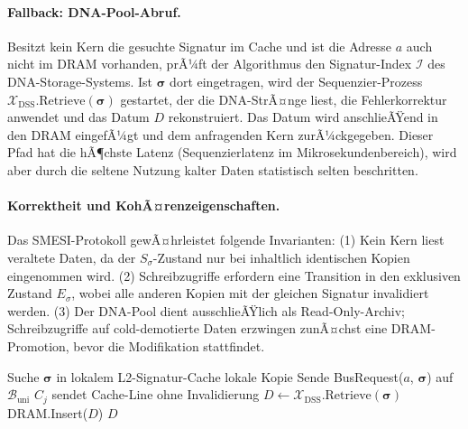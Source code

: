 ﻿\documentclass[a4paper,12pt]{article}
\theoremstyle{definition}
\begin{document}
\paragraph{Fallback: DNA-Pool-Abruf.}
Besitzt kein Kern die gesuchte Signatur im Cache und ist die Adresse $a$ auch nicht im DRAM vorhanden, prÃ¼ft der Algorithmus den Signatur-Index $\mathcal{I}$ des DNA-Storage-Systems. Ist $\boldsymbol{\sigma}$ dort eingetragen, wird der Sequenzier-Prozess $\mathcal{X}_{\mathrm{DSS}}.\mathrm{Retrieve}(\boldsymbol{\sigma})$ gestartet, der die DNA-StrÃ¤nge liest, die Fehlerkorrektur anwendet und das Datum $D$ rekonstruiert. Das Datum wird anschlieÃŸend in den DRAM eingefÃ¼gt und dem anfragenden Kern zurÃ¼ckgegeben. Dieser Pfad hat die hÃ¶chste Latenz (Sequenzierlatenz im Mikrosekundenbereich), wird aber durch die seltene Nutzung kalter Daten statistisch selten beschritten.

\paragraph{Korrektheit und KohÃ¤renzeigenschaften.}
Das SMESI-Protokoll gewÃ¤hrleistet folgende Invarianten: (1) Kein Kern liest veraltete Daten, da der $S_\sigma$-Zustand nur bei inhaltlich identischen Kopien eingenommen wird. (2) Schreibzugriffe erfordern eine Transition in den exklusiven Zustand $E_\sigma$, wobei alle anderen Kopien mit der gleichen Signatur invalidiert werden. (3) Der DNA-Pool dient ausschlieÃŸlich als Read-Only-Archiv; Schreibzugriffe auf cold-demotierte Daten erzwingen zunÃ¤chst eine DRAM-Promotion, bevor die Modifikation stattfindet.

\begin{algorithm}[H]
  \caption{SMESI-Protokoll: KohÃ¤renz-Lookup via Signatur}
  \label{alg:smesi_lookup}
  \begin{algorithmic}[1]
    \State Suche $\boldsymbol{\sigma}$ in lokalem L2-Signatur-Cache
        \State \Return lokale Kopie 
      \EndIf
    \EndIf
    \State Sende BusRequest($a$, $\boldsymbol{\sigma}$) auf $\mathcal{B}_{\mathrm{uni}}$
      \State $C_j$ sendet Cache-Line ohne Invalidierung 
    \EndFor
       
        \State $D \gets \mathcal{X}_{\mathrm{DSS}}.\mathrm{Retrieve}(\boldsymbol{\sigma})$
        \State DRAM.Insert($D$)
        \State \Return $D$
      \EndIf
    \EndIf
  \end{algorithmic}
\end{algorithm}
\end{document}
